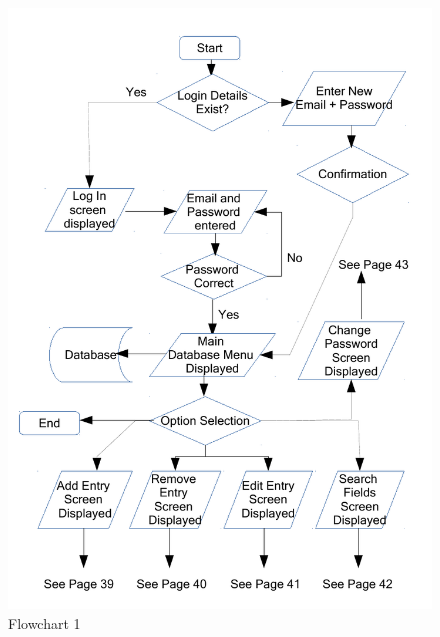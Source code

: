\begin{figure}[H]
    \caption{Flowchart 1} \label{Flowchart_1.pdf}
    \includegraphics[width=\textwidth]{./Design/Flowcharts/Flowchart_1.pdf}
\end{figure}

